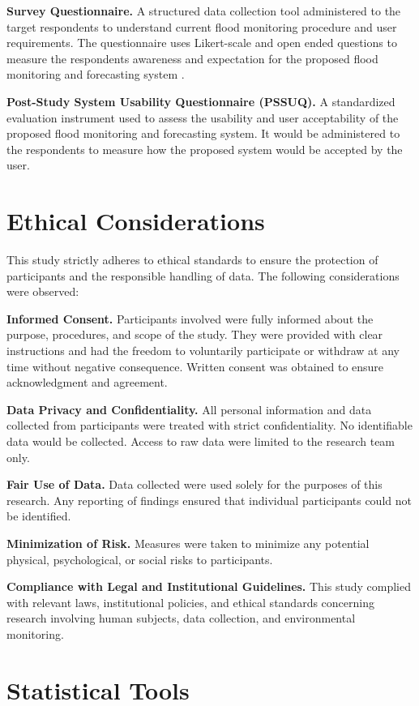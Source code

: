 \documentclass{research}
\begin{document}
\textbf{Survey Questionnaire.} A structured data collection tool administered to the target respondents to understand current flood monitoring procedure and user requirements. The questionnaire uses Likert-scale and open ended questions to measure the respondents awareness and expectation for the proposed flood monitoring and forecasting system .

\textbf{Post-Study System Usability Questionnaire (PSSUQ).} A 
standardized evaluation instrument used to assess the usability 
and user acceptability of the proposed flood monitoring and forecasting system. 
It would be administered to the 
respondents to measure how the proposed system would be accepted by the user. 

\section{Ethical Considerations}

This study strictly adheres to ethical standards to ensure the protection of participants and the responsible handling of data. The following considerations were observed:

\textbf{Informed Consent.} Participants involved were fully informed about the purpose, procedures, and scope of the study. They were provided with clear instructions and had the freedom to voluntarily participate or withdraw at any time without negative consequence. Written consent was obtained to ensure acknowledgment and agreement.

\textbf{Data Privacy and Confidentiality.} All personal information and data collected from participants were treated with strict confidentiality. No identifiable data would be collected. Access to raw data were limited to the research team only.

\textbf{Fair Use of Data.} Data collected were used solely for the purposes of this research. Any reporting of findings ensured that individual participants could not be identified.

\textbf{Minimization of Risk.} Measures were taken to minimize any potential physical, psychological, or social risks to participants.

\textbf{Compliance with Legal and Institutional Guidelines.} This study complied with relevant laws, institutional policies, and ethical standards concerning research involving human subjects, data collection, and environmental monitoring.

\section{Statistical Tools}
\end{document}
